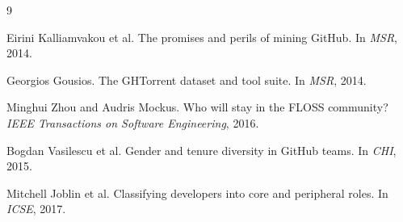\documentclass[12pt,a4paper]{article}
\begin{document}


\begin{thebibliography}{9}

Eirini Kalliamvakou et al.
\newblock The promises and perils of mining GitHub.
\newblock In \emph{MSR}, 2014.

Georgios Gousios.
\newblock The GHTorrent dataset and tool suite.
\newblock In \emph{MSR}, 2014.

Minghui Zhou and Audris Mockus.
\newblock Who will stay in the FLOSS community?
\newblock \emph{IEEE Transactions on Software Engineering}, 2016.

Bogdan Vasilescu et al.
\newblock Gender and tenure diversity in GitHub teams.
\newblock In \emph{CHI}, 2015.

Mitchell Joblin et al.
\newblock Classifying developers into core and peripheral roles.
\newblock In \emph{ICSE}, 2017.

\end{thebibliography}
\end{document}
